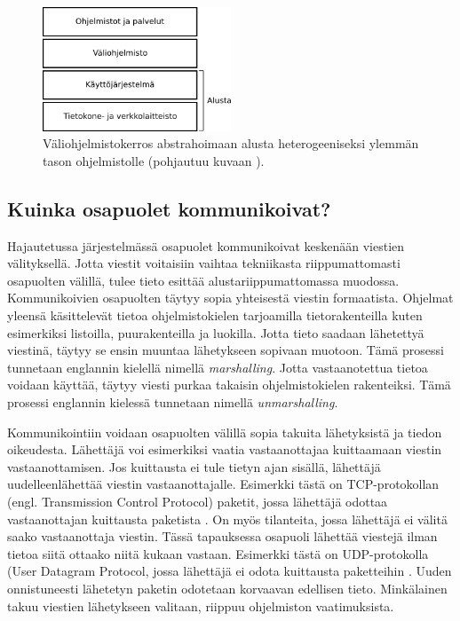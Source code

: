 \begin{figure}[ht!]
	\includegraphics[width=0.5\textwidth]{pictures/middleware-architecture.png}
	\caption{Väliohjelmistokerros abstrahoimaan alusta heterogeeniseksi ylemmän tason ohjelmistolle (pohjautuu kuvaan \mbox{\cite[s.~52]{distributed-systems-concepts-and-design}}).}
	\label{fig:middleware-architecture}
\end{figure}


\subsection{Kuinka osapuolet kommunikoivat?}
Hajautetussa järjestelmässä osapuolet kommunikoivat keskenään viestien välityksellä. Jotta viestit voitaisiin vaihtaa tekniikasta riippumattomasti osapuolten välillä, tulee tieto esittää alustariippumattomassa muodossa. Kommunikoivien osapuolten täytyy sopia yhteisestä viestin formaatista. Ohjelmat yleensä käsittelevät tietoa ohjelmistokielen tarjoamilla tietorakenteilla kuten esimerkiksi listoilla, puurakenteilla ja luokilla. Jotta tieto saadaan lähetettyä viestinä, täytyy se ensin muuntaa lähetykseen sopivaan muotoon. Tämä prosessi tunnetaan englannin kielellä nimellä \emph{marshalling}. Jotta vastaanotettua tietoa voidaan käyttää, täytyy viesti purkaa takaisin ohjelmistokielen rakenteiksi. Tämä prosessi englannin kielessä tunnetaan nimellä \emph{unmarshalling}. \mbox{\cite[s.~158]{distributed-systems-concepts-and-design}}

Kommunikointiin voidaan osapuolten välillä sopia takuita lähetyksistä ja tiedon oikeudesta. Lähettäjä voi esimerkiksi vaatia vastaanottajaa kuittaamaan viestin vastaanottamisen. Jos kuittausta ei tule tietyn ajan sisällä, lähettäjä uudelleenlähettää viestin vastaanottajalle. Esimerkki tästä on TCP-protokollan (engl. Transmission Control Protocol) paketit, jossa lähettäjä odottaa vastaanottajan kuittausta paketista \cite[s.~9--10]{tcp-standard}. On myös tilanteita, jossa lähettäjä ei välitä saako vastaanottaja viestin. Tässä tapauksessa osapuoli lähettää viestejä ilman tietoa siitä ottaako niitä kukaan vastaan. Esimerkki tästä on UDP-protokolla (User Datagram Protocol, jossa lähettäjä ei odota kuittausta paketteihin \cite{udp-standard}. Uuden onnistuneesti lähetetyn paketin odotetaan korvaavan edellisen tieto. Minkälainen takuu viestien lähetykseen valitaan, riippuu ohjelmiston vaatimuksista.



